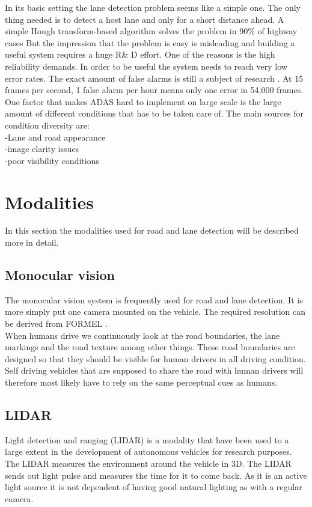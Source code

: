 In its basic setting the lane detection problem seems like a simple one. The only thing needed is to detect a host lane and only for a short distance ahead. A simple Hough transform-based algorithm solves the problem in 90\% of highway cases %
But the impression that the problem is easy is misleading and building a useful system requires a huge R\& D effort. One of the reasons is the high reliability demands. In order to be useful the system needs to reach very low error rates. The exact amount of false alarms is still a subject of research \cite{BarHillel2014}.
At 15 frames per second, 1 false alarm per hour means only one error in 54,000 frames. \\


One factor that makes ADAS hard to implement on large scale is the large amount of different conditions that has to be taken care of. The main sources for condition diversity are:\\
-Lane and road appearance\\
-image clarity issues\\
-poor visibility conditions\\

\section{Modalities}
In this section the modalities used for road and lane detection will be described more in detail.

\subsection{Monocular vision}
The monocular vision system is frequently used for road and lane detection. It is more simply put one camera mounted on the vehicle. The required resolution can be derived from FORMEL \cite{BarHillel2014}.\\
When humans drive we continuously look at the road boundaries, the lane markings and the road texture among other things. These road boundaries are designed so that they should be visible for human drivers in all driving condition. Self driving vehicles that are supposed to share the road with human drivers will therefore most likely have to rely on the same perceptual cues as humans.

\subsection{LIDAR}
Light detection and ranging (LIDAR) is a modality that have been used to a large extent in the development of autonomous vehicles for research purposes. The LIDAR measures the environment around the vehicle in 3D. The LIDAR sends out light pulse and measures the time for it to come back. As it is an active light source it is not dependent of having good natural lighting as with a regular camera. \\

